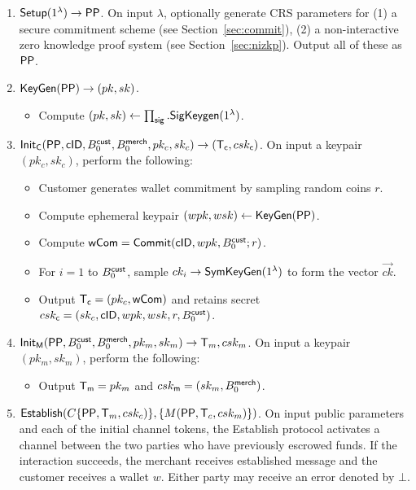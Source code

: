 \documentclass[11pt]{report}
\newcommand{\BC}{B^{\text{\sf cust}}_{\text{0}}}
\newcommand{\BM}{B^{\text{\sf merch}}_{\text{0}}}
\begin{document}
\begin{enumerate}

\item ${\sf Setup}(1^\lambda) \rightarrow {\sf PP}$. On input $\lambda$, optionally generate CRS parameters for (1) a secure commitment scheme (see Section~\ref{sec:commit}), (2) a non-interactive zero knowledge proof system (see Section~\ref{sec:nizkp}). Output all of these as ${\sf PP}$.

\item ${\sf KeyGen}({\sf PP}) \rightarrow (pk, sk)$. 
\begin{itemize}
\item Compute $(pk, sk) \leftarrow \prod_{\sf sig}.{\sf SigKeygen}(1^\lambda)$. %
\end{itemize}

\medskip \noindent
\item ${\sf Init_{C}}({\sf PP}, {\sf cID}, \BC, \BM, pk_c, sk_c) \rightarrow ({\sf T}_{\sf c}, csk_{\sf c})$. On input a keypair $(pk_c, sk_c)$, perform the following:

\begin{itemize} 
\item Customer generates wallet commitment by sampling random coins $r$.
\item Compute ephemeral keypair $(wpk, wsk) \leftarrow {\sf KeyGen}({\sf PP})$.
\item Compute ${\sf wCom} = {\sf Commit}({\sf cID}, wpk, \BC; r)$.
\item For $i = 1$ to $\BC$, sample $ck_i \rightarrow {\sf SymKeyGen}(1^\lambda)$ to form the vector $\vec{ck}$. 
\item Output ${\sf T}_{\sf c} = (pk_c, {\sf wCom})$ and retains secret $csk_{\sf c} = (sk_c, {\sf cID}, wpk, wsk, r, \BC)$.
\end{itemize}

\item ${\sf Init_{M}}({\sf PP}, \BC, \BM, pk_m, sk_m) \rightarrow {\sf T}_m, csk_m$. On input a keypair $(pk_m, sk_m)$, perform the following:

\begin{itemize} 
\item Output ${\sf T}_{\sf m} = pk_m$ and $csk_{\sf m} = (sk_m, \BM)$.
\end{itemize}

\item ${\sf Establish}( C\{{\sf PP}, {\sf T}_m, csk_c)\}, \{M({\sf PP}, {\sf T}_c, csk_{m})\})$. On input public parameters and each of the initial
channel tokens, the {\sf Establish} protocol activates a channel between the two parties who have previously
escrowed funds. If the interaction succeeds, the merchant receives {\sf established} message and the customer
receives a wallet $w$. Either party may receive an error denoted by $\bot$.


\end{enumerate}
\end{document}
